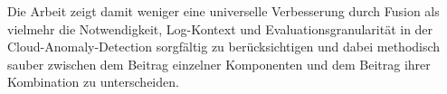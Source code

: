 Die Arbeit zeigt damit weniger eine universelle Verbesserung durch Fusion als
vielmehr die Notwendigkeit, Log-Kontext und Evaluationsgranularität in der
Cloud-Anomaly-Detection sorgfältig zu berücksichtigen und dabei methodisch
sauber zwischen dem Beitrag einzelner Komponenten und dem Beitrag ihrer
Kombination zu unterscheiden.

